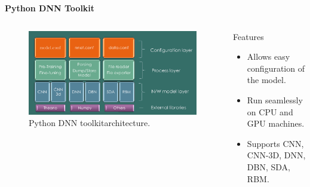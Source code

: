 \begin{frame}{\textbf{Python DNN Toolkit}}
\begin{columns}
	\begin{column}{0.55\textwidth}
		\begin{figure}
			\centering
				\includegraphics[width=\textwidth]{./img/architecture.png}
			\caption{Python DNN toolkit\footnotemark architecture.}
		\end{figure}
	\end{column}
	\begin{column}{0.4\textwidth}
		\begin{varblock}[\textwidth]{Features}
			\begin{itemize}							
				\item Allows easy configuration of the model.
				\item Run seamlessly on CPU and GPU machines.
				\item Supports CNN, CNN-3D, DNN, DBN, SDA, RBM.			
			\end{itemize}
		\end{varblock}
	\end{column}
\end{columns}
\end{frame}
